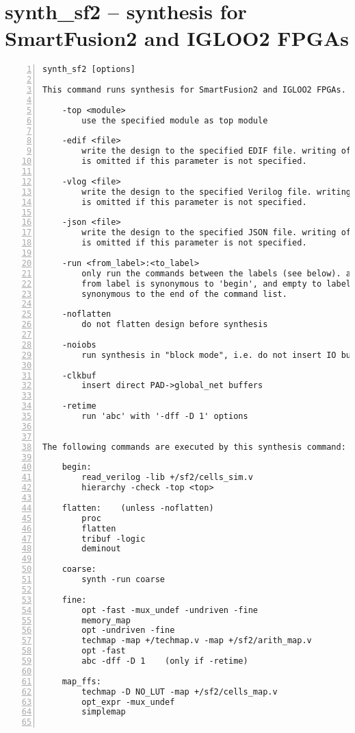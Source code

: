 \section{synth\_sf2 -- synthesis for SmartFusion2 and IGLOO2 FPGAs}
\label{cmd:synth_sf2}
\begin{lstlisting}[numbers=left,frame=single]
    synth_sf2 [options]

This command runs synthesis for SmartFusion2 and IGLOO2 FPGAs.

    -top <module>
        use the specified module as top module

    -edif <file>
        write the design to the specified EDIF file. writing of an output file
        is omitted if this parameter is not specified.

    -vlog <file>
        write the design to the specified Verilog file. writing of an output file
        is omitted if this parameter is not specified.

    -json <file>
        write the design to the specified JSON file. writing of an output file
        is omitted if this parameter is not specified.

    -run <from_label>:<to_label>
        only run the commands between the labels (see below). an empty
        from label is synonymous to 'begin', and empty to label is
        synonymous to the end of the command list.

    -noflatten
        do not flatten design before synthesis

    -noiobs
        run synthesis in "block mode", i.e. do not insert IO buffers

    -clkbuf
        insert direct PAD->global_net buffers

    -retime
        run 'abc' with '-dff -D 1' options


The following commands are executed by this synthesis command:

    begin:
        read_verilog -lib +/sf2/cells_sim.v
        hierarchy -check -top <top>

    flatten:    (unless -noflatten)
        proc
        flatten
        tribuf -logic
        deminout

    coarse:
        synth -run coarse

    fine:
        opt -fast -mux_undef -undriven -fine
        memory_map
        opt -undriven -fine
        techmap -map +/techmap.v -map +/sf2/arith_map.v
        opt -fast
        abc -dff -D 1    (only if -retime)

    map_ffs:
        techmap -D NO_LUT -map +/sf2/cells_map.v
        opt_expr -mux_undef
        simplemap


\end{lstlisting}

